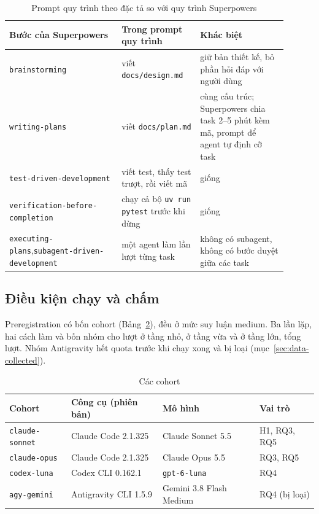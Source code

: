 \begin{table}[H]
\centering\footnotesize
\caption{Prompt quy trình theo đặc tả so với quy trình Superpowers}
\label{tab:superpowers}
\begin{tabular}{>{\raggedright\arraybackslash}p{0.36\linewidth}>{\raggedright\arraybackslash}p{0.25\linewidth}>{\raggedright\arraybackslash}p{0.29\linewidth}}
\toprule
Bước của Superpowers & Trong prompt quy trình & Khác biệt \\
\midrule
\texttt{brainstorming} & viết \texttt{docs/design.md} & giữ bản thiết kế, bỏ phần hỏi đáp với người dùng \\
\texttt{writing-plans} & viết \texttt{docs/plan.md} & cùng cấu trúc; Superpowers chia task 2--5 phút kèm mã, prompt
để agent tự định cỡ task \\
\texttt{test-driven-development} & viết test, thấy test trượt, rồi viết mã & giống \\
\texttt{verification-before-completion} & chạy cả bộ \texttt{uv run pytest} trước khi dừng & giống \\
\texttt{executing-plans},\newline \texttt{subagent-driven-development} & một agent làm lần lượt từng task & không
có subagent, không có bước duyệt giữa các task \\
\bottomrule
\end{tabular}
\end{table}

\subsection{Điều kiện chạy và chấm}\label{sec:conditions}

Preregistration có bốn cohort (Bảng~\ref{tab:cohorts}), đều ở mức suy luận medium. Ba lần lặp, hai cách làm và
bốn nhóm cho \NumRunsSmallTotal{} lượt ở tầng nhỏ, \NumRunsMediumTotal{} ở tầng vừa và \NumRunsLargeTotal{} ở
tầng lớn, tổng \NumRunsTotal{} lượt. Nhóm Antigravity hết quota trước khi chạy xong và bị loại
(mục~\ref{sec:data-collected}).

\begin{table}[H]
\centering\small
\caption{Các cohort}\label{tab:cohorts}
\begin{tabularx}{\linewidth}{@{}lllX@{}}
\toprule
Cohort & Công cụ (phiên bản) & Mô hình & Vai trò \\
\midrule
\texttt{claude-sonnet} & Claude Code 2.1.325 & Claude Sonnet 5.5 & H1, RQ3, RQ5 \\
\texttt{claude-opus} & Claude Code 2.1.325 & Claude Opus 5.5 & RQ3, RQ5 \\
\texttt{codex-luna} & Codex CLI 0.162.1 & \texttt{gpt-6-luna} & RQ4 \\
\texttt{agy-gemini} & Antigravity CLI 1.5.9 & Gemini 3.8 Flash Medium & RQ4 (bị loại) \\
\bottomrule
\end{tabularx}
\end{table}


